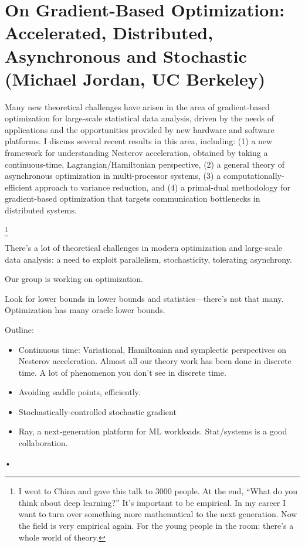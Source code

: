 \section{On Gradient-Based Optimization: Accelerated, Distributed, Asynchronous and Stochastic (Michael Jordan, UC Berkeley)}

Many new theoretical challenges have arisen in the area of gradient-based optimization for large-scale statistical data analysis, driven by the needs of applications and the opportunities provided by new hardware and software platforms. I discuss several recent results in this area, including: (1) a new framework for understanding Nesterov acceleration, obtained by taking a continuous-time, Lagrangian/Hamiltonian perspective, (2) a general theory of asynchronous optimization in multi-processor systems, (3) a computationally-efficient approach to variance reduction, and (4) a primal-dual methodology for gradient-based optimization that targets communication bottlenecks in distributed systems.

\footnote{I went to China and gave this talk to 3000 people. At the end, ``What do you think about deep learning?'' It's important to be empirical. In my career I want to turn over something more mathematical to the next generation. Now the field is very empirical again. For the young people in the room: there's a whole world of theory.}

There's a lot of theoretical challenges in modern optimization and large-scale data analysis: a need to exploit parallelism, stochasticity, tolerating asynchrony. 

Our group is working on optimization.

Look for lower bounds in lower bounds and statistics---there's not that many.  Optimization has many oracle lower bounds. 

Outline: 
\begin{itemize}
\item
Continuous time: Variational, Hamiltonian and symplectic perspectives on Nesterov acceleration.
Almost all our theory work has been done in discrete time. A lot of phenomenon you don't see in discrete time.
\item
Avoiding saddle points, efficiently.
\item
Stochastically-controlled stochastic gradient
\item
Ray, a next-generation platform for ML workloads. Stat/systems is a good collaboration.
\end{itemize}•

